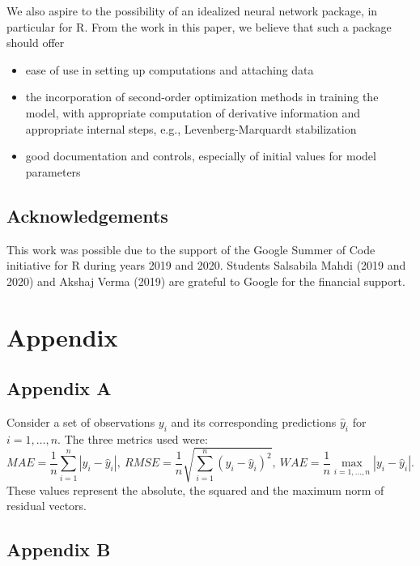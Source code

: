 We also aspire to the possibility of an idealized neural network
package, in particular for R. From the work in this paper, we believe
that such a package should offer

\begin{itemize}
\tightlist
\item
  ease of use in setting up computations and attaching data
\item
  the incorporation of second-order optimization methods in training the
  model, with appropriate computation of derivative information and
  appropriate internal steps, e.g., Levenberg-Marquardt stabilization
\item
  good documentation and controls, especially of initial values for
  model parameters
\end{itemize}

\hypertarget{acknowledgements}{%
\subsection{Acknowledgements}\label{acknowledgements}}

This work was possible due to the support of the Google Summer of Code
initiative for R during years 2019 and 2020. Students Salsabila Mahdi
(2019 and 2020) and Akshaj Verma (2019) are grateful to Google for the
financial support.



\hypertarget{appendix}{%
\section{Appendix}\label{appendix}}

\hypertarget{appendix-a}{%
\subsection{Appendix A}\label{appendix-a}}

Consider a set of observations \(y_i\) and its corresponding predictions
\(\hat y_i\) for \(i=1,\dots,n\). The three metrics used were: \[
MAE = \frac1n\sum_{i=1}^n|y_i - \hat y_i|,~
RMSE = \frac1n\sqrt{\sum_{i=1}^n(y_i - \hat y_i)^2},~
WAE = \frac1n\max_{i=1,\dots,n}|y_i - \hat y_i|.
\] These values represent the absolute, the squared and the maximum norm
of residual vectors.

\hypertarget{appendix-b}{%
\subsection{Appendix B}\label{appendix-b}}

